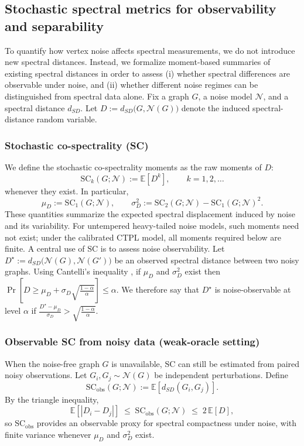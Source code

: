 \documentclass[
  11pt,
  letterpaper]{siamart251216}
\begin{document}
\subsection{Stochastic spectral metrics for observability and
separability}\label{sec-scssi}

To quantify how vertex noise affects spectral measurements, we do not
introduce new spectral distances. Instead, we formalize moment-based
summaries of existing spectral distances in order to assess (i) whether
spectral differences are observable under noise, and (ii) whether
different noise regimes can be distinguished from spectral data alone.
Fix a graph \(G\), a noise model \(\mathcal N\), and a spectral distance
\(d_{SD}\). Let \(D := d_{SD}\bigl(G,\mathcal N(G)\bigr)\) denote the
induced spectral-distance random variable.

\subsubsection{Stochastic co-spectrality
(SC)}\label{stochastic-co-spectrality-sc}

We define the stochastic co-spectrality moments as the raw moments of
\(D\): \[
\mathrm{SC}_k(G;\mathcal N) := \mathbb E[D^k], \qquad k=1,2,\ldots
\] whenever they exist. In particular, \[
\mu_D := \mathrm{SC}_1(G;\mathcal N),
\qquad
\sigma_D^2 := \mathrm{SC}_2(G;\mathcal N)-\mathrm{SC}_1(G;\mathcal N)^2 .
\] These quantities summarize the expected spectral displacement induced
by noise and its variability. For untempered heavy-tailed noise models,
such moments need not exist; under the calibrated CTPL model, all
moments required below are finite. A central use of \(\mathrm{SC}\) is
to assess noise observability. Let
\(D^\star := d_{SD}\bigl(\mathcal N(G),\mathcal N(G')\bigr)\) be an
observed spectral distance between two noisy graphs. Using Cantelli's
inequality \citep{Cantelli1910}, if \(\mu_D\) and \(\sigma_D^2\) exist
then
\(\Pr\!\left[D \ge \mu_D + \sigma_D \sqrt{\tfrac{1-\alpha}{\alpha}}\right] \le \alpha.\)
We therefore say that \(D^\star\) is noise-observable at level
\(\alpha\) if
\(\frac{D^\star-\mu_D}{\sigma_D} > \sqrt{\tfrac{1-\alpha}{\alpha}}.\)

\subsubsection{Observable SC from noisy data (weak-oracle
setting)}\label{observable-sc-from-noisy-data-weak-oracle-setting}

When the noise-free graph \(G\) is unavailable, \(\mathrm{SC}\) can
still be estimated from paired noisy observations. Let
\(G_i,G_j\sim\mathcal N(G)\) be independent perturbations. Define \[
\mathrm{SC}_{\mathrm{obs}}(G;\mathcal N)
:= \mathbb E\!\left[d_{SD}(G_i,G_j)\right].
\] By the triangle inequality, \[
\mathbb E\!\left[|D_i-D_j|\right]
\;\le\;
\mathrm{SC}_{\mathrm{obs}}(G;\mathcal N)
\;\le\;
2\,\mathbb E[D],
\] so \(\mathrm{SC}_{\mathrm{obs}}\) provides an observable proxy for
spectral compactness under noise, with finite variance whenever
\(\mu_D\) and \(\sigma_D^2\) exist.
\end{document}
